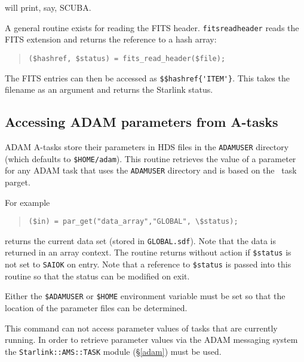 \documentclass[twoside,11pt]{article}
\newenvironment{myquote}{\begin{quote}\begin{small}}{\end{small}\end{quote}}
\newcommand{\task}[1]{{\sf #1}}
\newcommand{\Kappa}{\xref{{\sc{Kappa}}}{sun95}{}}
\newcommand{\parget}{\xref{\task{parget}}{sun95}{PARGET}}
\newcommand{\xref}[3]{#1}
\newcommand{\xlabel}[1]{}
\renewcommand{\_}{\texttt{\symbol{95}}}
\begin{document}
will print, say, SCUBA.

A general routine exists for reading the FITS header.
\texttt{fits\_read\_header} reads the FITS extension and returns the
reference to a hash array:

\begin{myquote}
\begin{verbatim}
($hashref, $status) = fits_read_header($file);
\end{verbatim}
\end{myquote}

The FITS entries can then be accessed as \verb+$$hashref{'ITEM'}+.
This takes the filename as an argument and returns the Starlink status.

\subsection{\xlabel{accessing_adam_parameters_from_atasks}Accessing ADAM parameters from A-tasks}%
\label{accessing_adam_parameters_from_atasks}

ADAM A-tasks store their parameters in HDS files in the \texttt{ADAM\_USER}
directory (which defaults to \texttt{\$HOME/adam}). This routine retrieves the
value of a parameter for any ADAM task that uses the \texttt{ADAM\_USER}
directory and is based on the \Kappa\ task \parget.

For example
\begin{myquote}
\begin{verbatim}
($in) = par_get("data_array","GLOBAL", \$status);
\end{verbatim}
\end{myquote}

returns the current data set (stored in \texttt{GLOBAL.sdf}). Note that
the data is returned in an array context. The routine returns without
action if \texttt{\$status} is not set to \texttt{SAI\_\_OK} on entry.
Note that a reference to \texttt{\$status} is passed into this routine
so that the status can be modified on exit.

Either the \texttt{\$ADAM\_USER} or \texttt{\$HOME} environment
variable must be set so that the location of the parameter files can be
determined.

This command can not access parameter values of tasks that are currently
running.  In order to retrieve parameter values via the ADAM messaging system
the \texttt{Starlink::AMS::TASK} module (\S\ref{adam}) must be
used.
\end{document}
